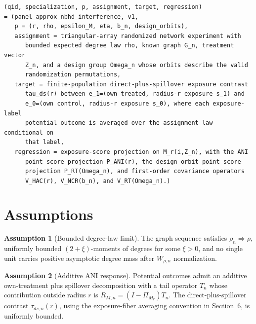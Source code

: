 \documentclass[11pt]{article}
\theoremstyle{definition}
\newtheorem{assumption}{Assumption}
\theoremstyle{plain}
\theoremstyle{remark}
\begin{document}
\begin{verbatim}
(qid, specialization, p, assignment, target, regression)
= (panel_approx_nbhd_interference, v1,
   p = (r, rho, epsilon_M, eta, b_n, design_orbits),
   assignment = triangular-array randomized network experiment with
      bounded expected degree law rho, known graph G_n, treatment vector
      Z_n, and a design group Omega_n whose orbits describe the valid
      randomization permutations,
   target = finite-population direct-plus-spillover exposure contrast
      tau_ds(r) between e_1=(own treated, radius-r exposure s_1) and
      e_0=(own control, radius-r exposure s_0), where each exposure-label
      potential outcome is averaged over the assignment law conditional on
      that label,
   regression = exposure-score projection on M_r(i,Z_n), with the ANI
      point-score projection P_ANI(r), the design-orbit point-score
      projection P_RT(Omega_n), and first-order covariance operators
      V_HAC(r), V_NCR(b_n), and V_RT(Omega_n).)
\end{verbatim}

\section{Assumptions}
\begin{assumption}[Bounded degree-law limit]\label{ass:degree-law}
The graph sequence satisfies \(\rho_n\Rightarrow\rho\), uniformly bounded
\((2+\xi)\)-moments of degrees for some \(\xi>0\), and no single unit carries
positive asymptotic degree mass after \(W_{\rho,n}\) normalization.
\end{assumption}

\begin{assumption}[Additive ANI response]\label{ass:additive-ani}
Potential outcomes admit an additive own-treatment plus spillover
decomposition with a tail operator \(T_n\) whose contribution outside radius
\(r\) is \(R_{M,n}=(I-\Pi_{M_r})T_n\).  The direct-plus-spillover contrast
\(\tau_{ds,n}(r)\), using the exposure-fiber averaging convention in
Section~6, is uniformly bounded.
\end{assumption}
\end{document}

